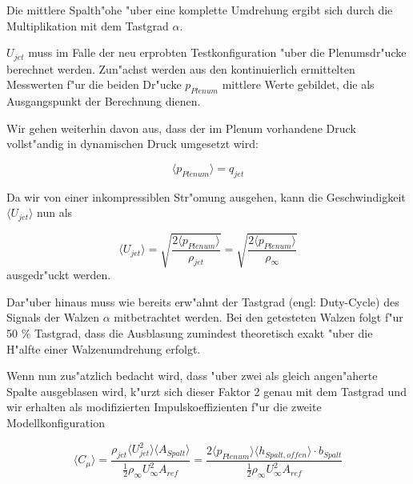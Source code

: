 Die mittlere Spalth"ohe "uber eine komplette Umdrehung ergibt sich durch die Multiplikation mit dem Tastgrad $\alpha$.


$U_{jet}$ muss im Falle der neu erprobten Testkonfiguration "uber die Plenumsdr"ucke berechnet werden.
Zun"achst werden aus den kontinuierlich ermittelten Messwerten f"ur die beiden Dr"ucke $p_{Plenum}$ mittlere Werte gebildet, die als Ausgangspunkt der Berechnung dienen.

Wir gehen weiterhin davon aus, dass der im Plenum vorhandene Druck vollst"andig in dynamischen Druck umgesetzt wird:

	\begin{equation}
	\label{eq:Annahme q}
		\langle{p_{Plenum}}\rangle = q_{jet}
	\end{equation}

Da wir  von einer inkompressiblen Str"omung ausgehen, kann die Geschwindigkeit $\langle{U_{jet}}\rangle$ nun als
	
	\begin{equation}
	\label{eq:jetgeschwindigkeit}
		\langle{U_{jet}}\rangle = \sqrt{\frac{2 \langle{p_{Plenum}}\rangle}{\rho_{jet}}} = \sqrt{\frac{2 \langle{p_{Plenum}}\rangle}{\rho_{\infty}}}
	\end{equation}
ausgedr"uckt werden.

Dar"uber hinaus muss wie bereits erw"ahnt der Tastgrad (engl: Duty-Cycle) des Signals der Walzen $\alpha$  mitbetrachtet werden.
Bei den getesteten Walzen folgt f"ur 50 \% Tastgrad, dass die Ausblasung zumindest theoretisch exakt "uber die H"alfte einer Walzenumdrehung erfolgt.

Wenn nun zus"atzlich bedacht wird, dass "uber zwei als gleich angen"aherte Spalte ausgeblasen wird, k"urzt sich dieser Faktor 2 genau mit dem Tastgrad und wir erhalten als modifizierten Impulskoeffizienten f"ur die zweite Modellkonfiguration

	\begin{equation}
	\label{eq:momentum-coeff-oscill-final}
		\langle{C_{\mu}}\rangle = \frac{\rho_{jet}\langle{U^2_{jet}}\rangle \langle{A_{Spalt}}\rangle} {\frac{1}{2}\rho_{\infty}U^2_{\infty}A_{ref}} = \frac{2\langle{p_{Plenum}}\rangle \langle{h_{Spalt,offen}}\rangle \cdot b_{Spalt}} {\frac{1}{2}\rho_{\infty}U^2_{\infty}A_{ref}}
	\end{equation}

